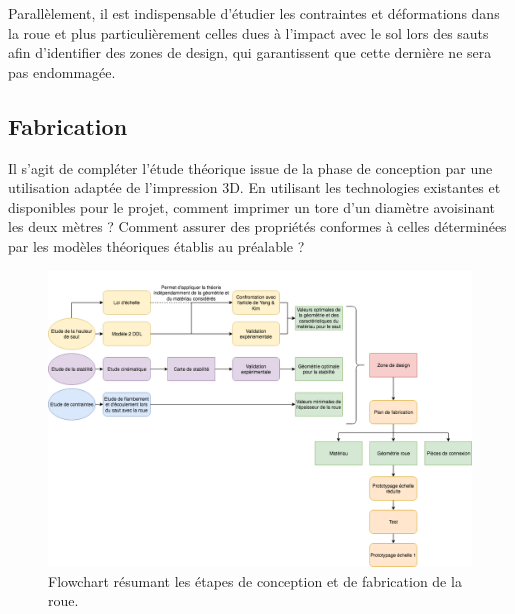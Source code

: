 Parallèlement, il est indispensable d’étudier les contraintes et déformations dans la roue et plus particulièrement celles dues à l’impact avec le sol lors des sauts afin d’identifier des zones de design, qui garantissent que cette dernière ne sera pas endommagée.

\subsection{Fabrication}
Il s’agit de compléter l’étude théorique issue de la phase de conception par une utilisation adaptée de l’impression 3D. En utilisant les technologies existantes et disponibles pour le projet, comment imprimer un tore d’un diamètre avoisinant les deux mètres ? Comment assurer des propriétés conformes à celles déterminées par les modèles théoriques établis au préalable ? 

\begin{figure}[htb]
\centering
\includegraphics[width=7in]{images_autres/flowchart.png}
\caption{Flowchart résumant les étapes de conception et de fabrication de la roue.}
\label{fig:flowchart}
\end{figure}

